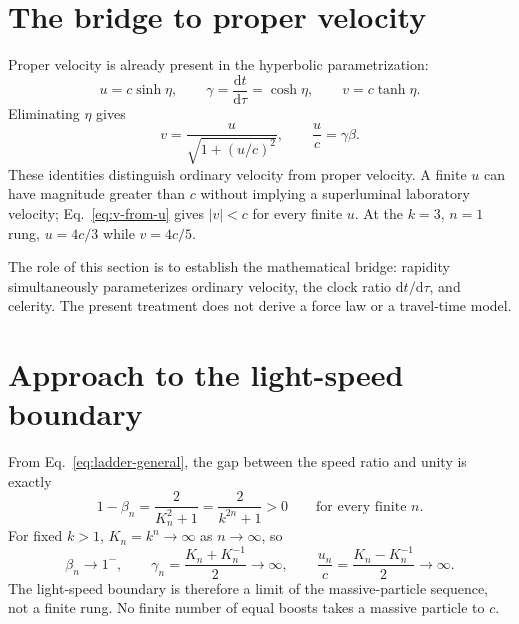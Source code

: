 \documentclass[12pt]{article}
\begin{document}
\section{The bridge to proper velocity}
\label{sec:proper-velocity-bridge}

Proper velocity is already present in the hyperbolic parametrization:
\begin{equation}
  u=c\sinh\eta,
  \qquad
  \gamma=\frac{\mathrm{d}t}{\mathrm{d}\tau}=\cosh\eta,
  \qquad
  v=c\tanh\eta.
  \label{eq:proper-velocity-rapidity}
\end{equation}
Eliminating $\eta$ gives
\begin{equation}
  v=\frac{u}{\sqrt{1+(u/c)^2}},
  \qquad
  \frac{u}{c}=\gamma\beta.
  \label{eq:v-from-u}
\end{equation}
These identities distinguish ordinary velocity from proper velocity. A finite $u$ can have magnitude greater than $c$ without implying a superluminal laboratory velocity; Eq.~\eqref{eq:v-from-u} gives $|v|<c$ for every finite $u$. At the $k=3$, $n=1$ rung, $u=4c/3$ while $v=4c/5$.

The role of this section is to establish the mathematical bridge: rapidity simultaneously parameterizes ordinary velocity, the clock ratio $\mathrm{d}t/\mathrm{d}\tau$, and celerity. The present treatment does not derive a force law or a travel-time model.

\section{Approach to the light-speed boundary}
\label{sec:light-limit}

From Eq.~\eqref{eq:ladder-general}, the gap between the speed ratio and unity is exactly
\begin{equation}
  1-\beta_n=\frac{2}{K_n^2+1}=\frac{2}{k^{2n}+1}>0
  \qquad\text{for every finite }n.
  \label{eq:finite-rung-gap}
\end{equation}
For fixed $k>1$, $K_n=k^n\to\infty$ as $n\to\infty$, so
\begin{equation}
  \beta_n\longrightarrow1^{-},
  \qquad
  \gamma_n=\frac{K_n+K_n^{-1}}{2}\longrightarrow\infty,
  \qquad
  \frac{u_n}{c}=\frac{K_n-K_n^{-1}}{2}\longrightarrow\infty.
  \label{eq:asymptotic-limit}
\end{equation}
The light-speed boundary is therefore a limit of the massive-particle sequence, not a finite rung. No finite number of equal boosts takes a massive particle to $c$.
\end{document}
